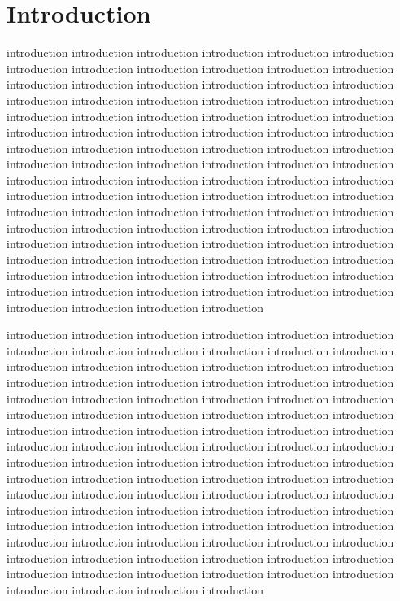\documentclass[platex,ja=standard,12pt,a4paper,twoside,onecolumn,fleqn,dvipdfmx,english]{bxjsbook}
\begin{document}
\chapter{Introduction}
introduction introduction introduction introduction introduction introduction introduction introduction introduction introduction introduction introduction introduction introduction introduction introduction introduction introduction introduction introduction introduction introduction introduction introduction introduction introduction introduction introduction introduction introduction introduction introduction introduction introduction introduction introduction introduction introduction introduction introduction introduction introduction introduction introduction introduction introduction introduction introduction introduction introduction introduction introduction introduction introduction introduction introduction introduction introduction introduction introduction introduction introduction introduction introduction introduction introduction introduction introduction introduction introduction introduction introduction introduction introduction introduction introduction introduction introduction introduction introduction introduction introduction introduction introduction introduction introduction introduction introduction introduction introduction introduction introduction introduction introduction introduction introduction introduction introduction introduction introduction

introduction introduction introduction introduction introduction introduction introduction introduction introduction introduction introduction introduction introduction introduction introduction introduction introduction introduction introduction introduction introduction introduction introduction introduction introduction introduction introduction introduction introduction introduction introduction introduction introduction introduction introduction introduction introduction introduction introduction introduction introduction introduction introduction introduction introduction introduction introduction introduction introduction introduction introduction introduction introduction introduction introduction introduction introduction introduction introduction introduction introduction introduction introduction introduction introduction introduction introduction introduction introduction introduction introduction introduction introduction introduction introduction introduction introduction introduction introduction introduction introduction introduction introduction introduction introduction introduction introduction introduction introduction introduction introduction introduction introduction introduction introduction introduction introduction introduction introduction introduction
\end{document}
